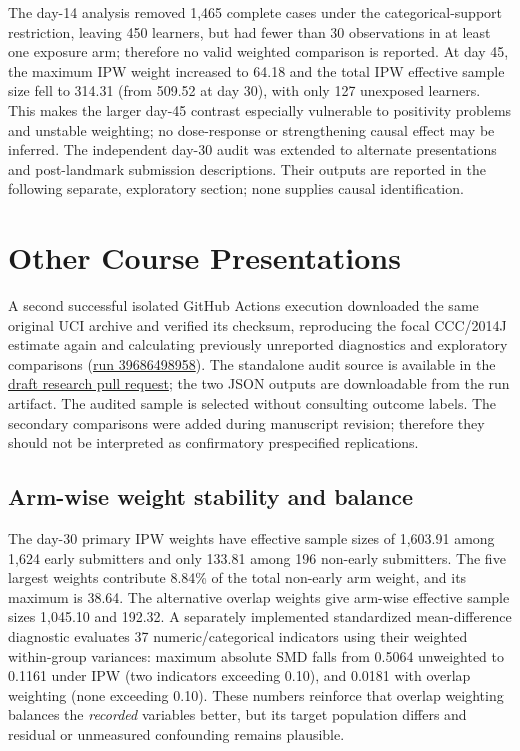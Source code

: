 \documentclass[10pt,a4paper]{article}
\begin{document}
The day-14 analysis removed 1,465 complete cases under the categorical-support restriction, leaving 450 learners, but had fewer than 30 observations in at least one exposure arm; therefore no valid weighted comparison is reported. At day 45, the maximum IPW weight increased to 64.18 and the total IPW effective sample size fell to 314.31 (from 509.52 at day 30), with only 127 unexposed learners. This makes the larger day-45 contrast especially vulnerable to positivity problems and unstable weighting; no dose-response or strengthening causal effect may be inferred. The independent day-30 audit was extended to alternate presentations and post-landmark submission descriptions. Their outputs are reported in the following separate, exploratory section; none supplies causal identification.


\section{Other Course Presentations}
A second successful isolated GitHub Actions execution downloaded the same original UCI archive and verified its checksum, reproducing the focal CCC/2014J estimate again and calculating previously unreported diagnostics and exploratory comparisons (\href{https://github.com/devissaputra/causal_learning_analytics/actions/runs/39686498958}{run 39686498958}). The standalone audit source is available in the \href{https://github.com/devissaputra/causal_learning_analytics/pull/1}{draft research pull request}; the two JSON outputs are downloadable from the run artifact. The audited sample is selected without consulting outcome labels. The secondary comparisons were added during manuscript revision; therefore they should not be interpreted as confirmatory prespecified replications.

\subsection{Arm-wise weight stability and balance}
The day-30 primary IPW weights have effective sample sizes of 1,603.91 among 1,624 early submitters and only 133.81 among 196 non-early submitters. The five largest weights contribute 8.84\% of the total non-early arm weight, and its maximum is 38.64. The alternative overlap weights give arm-wise effective sample sizes 1,045.10 and 192.32. A separately implemented standardized mean-difference diagnostic evaluates 37 numeric/categorical indicators using their weighted within-group variances: maximum absolute SMD falls from 0.5064 unweighted to 0.1161 under IPW (two indicators exceeding 0.10), and 0.0181 with overlap weighting (none exceeding 0.10). These numbers reinforce that overlap weighting balances the \emph{recorded} variables better, but its target population differs and residual or unmeasured confounding remains plausible.
\end{document}
